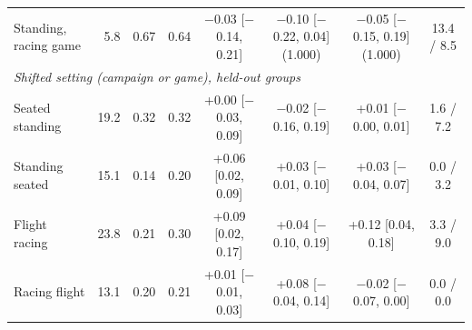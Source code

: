 \begin{table}[t]
\begin{tabular}{@{}lrcccccc@{}}
Standing, racing game & 5.8 & 0.67 & 0.64 & $-$0.03 [$-$0.14, 0.21] & $-$0.10 [$-$0.22, 0.04] (1.000) & $-$0.05 [$-$0.15, 0.19] (1.000) & 13.4 / 8.5 \\
\multicolumn{8}{l}{\emph{Shifted setting (campaign or game), held-out groups}} \\
Seated \ra{} standing & 19.2 & 0.32 & 0.32 & +0.00 [$-$0.03, 0.09] & $-$0.02 [$-$0.16, 0.19] & +0.01 [$-$0.00, 0.01] & 1.6 / 7.2 \\
Standing \ra{} seated & 15.1 & 0.14 & 0.20 & +0.06 [0.02, 0.09] & +0.03 [$-$0.01, 0.10] & +0.03 [$-$0.04, 0.07] & 0.0 / 3.2 \\
Flight \ra{} racing & 23.8 & 0.21 & 0.30 & +0.09 [0.02, 0.17] & +0.04 [$-$0.10, 0.19] & +0.12 [0.04, 0.18] & 3.3 / 9.0 \\
Racing \ra{} flight & 13.1 & 0.20 & 0.21 & +0.01 [$-$0.01, 0.03] & +0.08 [$-$0.04, 0.14] & $-$0.02 [$-$0.07, 0.00] & 0.0 / 0.0 \\
\bottomrule
\end{tabular}
\end{table}